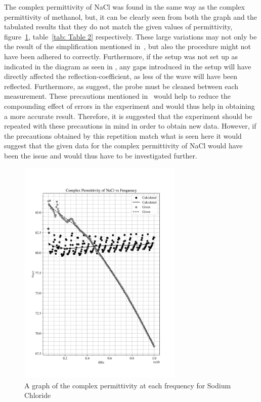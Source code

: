\documentclass[12pt, a4paper]{article}
\begin{document}
The complex permittivity of NaCl was found in the same way as the complex permittivity of methanol, but, it can be clearly seen from both the graph and the tabulated results that they do not match the given values of permittivity, figure~\ref{fig: NaCl Graph}, table~\ref{tab: Table 2} respectively. These large variations may not only be the result of the simplification mentioned in~\cite{marsland1987dielectric}, but also the procedure might not have been adhered to correctly. Furthermore, if the setup was not set up as indicated in the diagram as seen in \cite{marsland1987dielectric}, any gaps introduced in the setup will have directly affected the reflection-coefficient, as less of the wave will have been reflected. Furthermore, as \cite{marsland1987dielectric} suggest, the probe must be cleaned between each measurement. These precautions mentioned in~\cite{marsland1987dielectric} would help to reduce the compounding effect of errors in the experiment and would thus help in obtaining a more accurate result. Therefore, it is suggested that the experiment should be repeated with these precautions in mind in order to obtain new data. However, if the precautions obtained by this repetition match what is seen here it would suggest that the given data for the complex permittivity of NaCl would have been the issue and would thus have to be investigated further.

\begin{figure}[H]
    \centering
    \includegraphics[width = 0.7\textwidth]{Plot2.png}\caption{A graph of the complex permittivity at each frequency for Sodium Chloride}\label{fig: NaCl Graph}
\end{figure}
\end{document}
